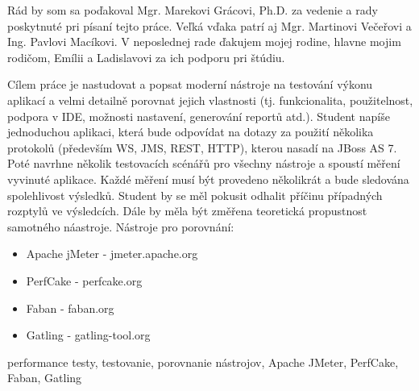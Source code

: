 \documentclass[12pt,oneside,final]{fithesis-utf8}
\begin{document}
\FrontMatter
\ThesisTitlePage

\begin{ThesisDeclaration}
\DeclarationText
\AdvisorName
\end{ThesisDeclaration}

\begin{ThesisThanks}

Rád by som sa poďakoval Mgr. Marekovi Grácovi, Ph.D.	za vedenie a rady poskytnuté pri písaní tejto práce. Veľká vďaka patrí aj Mgr. Martinovi Večeřovi a Ing. Pavlovi Macíkovi. V neposlednej rade ďakujem mojej rodine, hlavne mojim rodičom, Emílii a Ladislavovi za ich podporu pri štúdiu.

\end{ThesisThanks}

\begin{ThesisAbstract}
 Cílem práce je nastudovat a popsat moderní nástroje na testování výkonu aplikací a velmi detailně porovnat jejich vlastnosti (tj. funkcionalita, použitelnost, podpora v IDE, možnosti nastavení, generování reportů atd.). Student napíše jednoduchou aplikaci, která bude odpovídat na dotazy za použití několika protokolů (především WS, JMS, REST, HTTP), kterou nasadí na JBoss AS 7. Poté navrhne několik testovacích scénářů pro všechny nástroje a spoustí měření vyvinuté aplikace. Každé měření musí být provedeno několikrát a bude sledována spolehlivost výsledků. Student by se měl pokusit odhalit příčinu případných rozptylů ve výsledcích. Dále by měla být změřena teoretická propustnost samotného náastroje.
\newline \newline
Nástroje pro porovnání: 
\begin{itemize}

    \item Apache jMeter - jmeter.apache.org
    \item PerfCake - perfcake.org
    \item Faban - faban.org
    \item Gatling - gatling-tool.org

\end{itemize}
\end{ThesisAbstract}

\begin{ThesisKeyWords}
performance testy, testovanie, porovnanie nástrojov, Apache JMeter, PerfCake, Faban, Gatling
\end{ThesisKeyWords}

\tableofcontents
\listoffigures
\MainMatter
\end{document}
